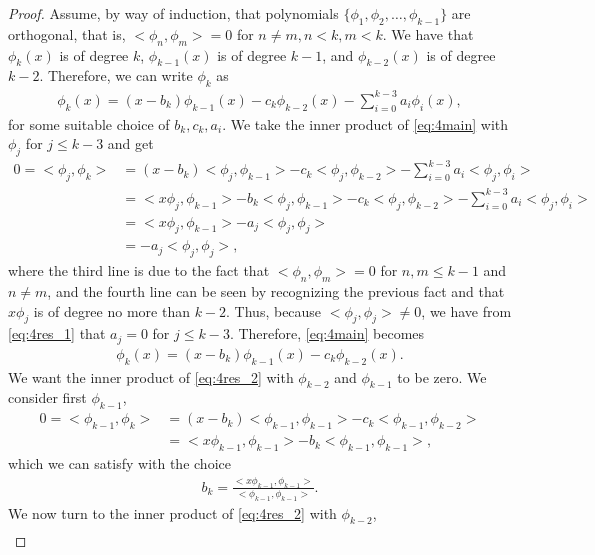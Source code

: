 \documentclass[10pt]{article}
\begin{document}
\begin{enumerate}
\begin{proof}
  Assume, by way of induction, that polynomials \(\{\phi _1, \phi _2, \dots , \phi _{k-1}\}\) are orthogonal, that is, \(<\phi_n, \phi_m> = 0\) for \(n\neq m, n < k, m < k\). We have that \(\phi_k(x)\) is of degree \(k\), \(\phi_{k-1}(x)\) is of degree \(k-1\), and \(\phi_{k-2}(x)\) is of degree \(k-2\). Therefore, we can write \(\phi_k\) as \begin{align}\label{eq:4main}
    \phi_k(x) = (x-b_k)\phi _{k-1}(x) - c_k \phi _{k-2}(x) - \sum_{i=0}^{k-3}a_i\phi _i(x),
  \end{align} for some suitable choice of \(b_k, c_k, a_i\). We take the inner product of \eqref{eq:4main} with \(\phi_j\) for \(j \leq k-3\) and get \begin{align}
    0 = <\phi _j, \phi _k> &= (x-b_k)<\phi _j, \phi _{k-1}> - c_k<\phi _j, \phi_{k-2}> - \sum_{i=0}^{k-3}a_i<\phi _j, \phi_i> \nonumber\\
    &= <x\phi _j, \phi _{k-1}> - b_k<\phi _j, \phi _{k-1}> - c_k<\phi _j, \phi_{k-2}> - \sum_{i=0}^{k-3}a_i<\phi _j, \phi_i> \nonumber\\
    &= <x\phi _j, \phi _{k-1}> - a_j<\phi _j, \phi_j> \nonumber \\
    &= -a_j<\phi _j, \phi_j>, \label{eq:4res_1}
  \end{align} where the third line is due to the fact that \(<\phi _n, \phi _m> = 0\) for \(n,m \leq k-1\) and \(n \neq m\), and the fourth line can be seen by recognizing the previous fact and that \(x\phi_j\) is of degree no more than \(k-2\). Thus, because \(<\phi _j, \phi _j> \neq 0\), we have from \eqref{eq:4res_1} that \(a_j = 0\) for \(j \leq k-3\). Therefore, \eqref{eq:4main} becomes \begin{align}\label{eq:4res_2}
    \phi_k(x) = (x-b_k)\phi _{k-1}(x) - c_k \phi _{k-2}(x).
  \end{align} We want the inner product of \eqref{eq:4res_2} with \(\phi_{k-2}\) and \(\phi_{k-1}\) to be zero. We consider first \(\phi_{k-1}\), \begin{align*}
      0 = <\phi _{k-1}, \phi _k> &= (x-b_k)<\phi _{k-1}, \phi _{k-1}> - c_k<\phi _{k-1}, \phi_{k-2}> \\
      &= <x\phi _{k-1}, \phi _{k-1}> - b_k<\phi _{k-1}, \phi _{k-1}>,
  \end{align*} which we can satisfy with the choice \begin{align*}
      b_k = \frac{<x\phi _{k-1}, \phi _{k-1}>}{<\phi _{k-1}, \phi _{k-1}>}.
  \end{align*} We now turn to the inner product of \eqref{eq:4res_2} with \(\phi _{k-2}\), \begin{align*}

\end{align*}
\end{proof}
\end{enumerate}
\end{document}
